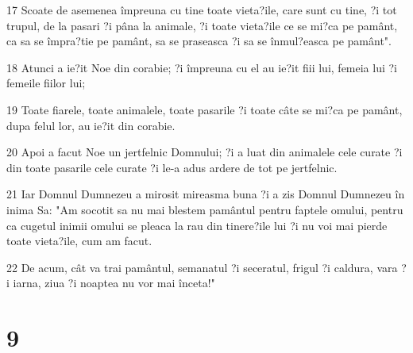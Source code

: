 \par 17 Scoate de asemenea împreuna cu tine toate vieta?ile, care sunt cu tine, ?i tot trupul, de la pasari ?i pâna la animale, ?i toate vieta?ile ce se mi?ca pe pamânt, ca sa se împra?tie pe pamânt, sa se praseasca ?i sa se înmul?easca pe pamânt".
\par 18 Atunci a ie?it Noe din corabie; ?i împreuna cu el au ie?it fiii lui, femeia lui ?i femeile fiilor lui;
\par 19 Toate fiarele, toate animalele, toate pasarile ?i toate câte se mi?ca pe pamânt, dupa felul lor, au ie?it din corabie.
\par 20 Apoi a facut Noe un jertfelnic Domnului; ?i a luat din animalele cele curate ?i din toate pasarile cele curate ?i le-a adus ardere de tot pe jertfelnic.
\par 21 Iar Domnul Dumnezeu a mirosit mireasma buna ?i a zis Domnul Dumnezeu în inima Sa: "Am socotit sa nu mai blestem pamântul pentru faptele omului, pentru ca cugetul inimii omului se pleaca la rau din tinere?ile lui ?i nu voi mai pierde toate vieta?ile, cum am facut.
\par 22 De acum, cât va trai pamântul, semanatul ?i seceratul, frigul ?i caldura, vara ?i iarna, ziua ?i noaptea nu vor mai înceta!"

\chapter{9}

